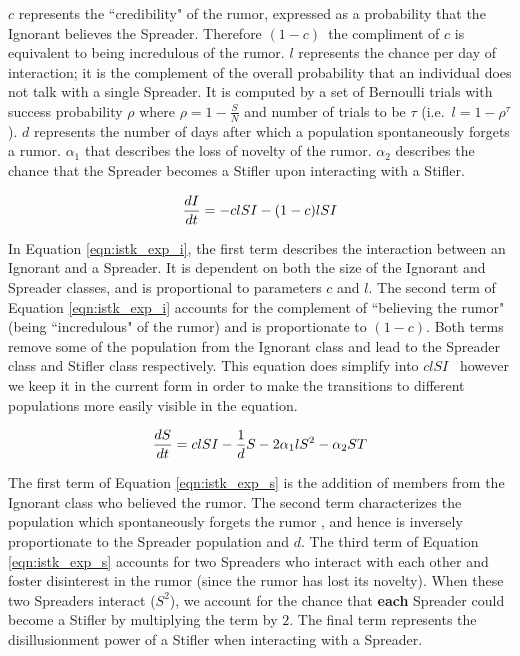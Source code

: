 $ c $ represents the ``credibility" of the rumor, expressed as a probability that the Ignorant believes the Spreader. Therefore $ (1 - c) $\, the compliment of $ c $ is equivalent to being incredulous of the rumor. $ l $ represents the chance per day of interaction; it is the complement of the overall probability that an individual does not talk with a single Spreader. It is computed by a set of Bernoulli trials with success probability $ \rho $ where $ \rho = 1 - \frac{S}{N} $ and number of trials to be $ \tau $ (i.e.~$ l = 1 - \rho^\tau $ ). $ d $ represents the number of days after which a population spontaneously forgets a rumor. $\alpha_1$ that describes the loss of novelty of the rumor. $ \alpha_2 $ describes the chance that the Spreader becomes a Stifler upon interacting with a Stifler.

\begin{equation} 
\label{eqn:istk_exp_i}
\frac{dI}{dt}  = - clSI - (1-c)lSI \\
\end{equation}
	
In Equation \ref{eqn:istk_exp_i}, the first term describes the interaction between an Ignorant and a Spreader. It is dependent on both the size of the Ignorant and Spreader classes, and is proportional to parameters $ c $ and $ l $.  The second term of Equation \ref{eqn:istk_exp_i} accounts for the complement of ``believing the rumor" (being ``incredulous" of the rumor) and is proportionate to $ (1 - c) $. Both terms remove some of the population from the Ignorant class and lead to the Spreader class and Stifler class respectively. This equation does simplify into $ clSI $ \, however we keep it in the current form in order to make the transitions to different populations more easily visible in the equation.

\begin{equation}
\label{eqn:istk_exp_s} \frac{dS}{dt} = clSI - \frac{1}{d} S - 2 \alpha_1l S^2 - \alpha_2 ST \\
\end{equation}

The first term of Equation \ref{eqn:istk_exp_s} is the addition of members from the Ignorant class who believed the rumor. The second term characterizes the population which spontaneously forgets the rumor , and hence is inversely proportionate to the Spreader population and $ d $. The third term of Equation \ref{eqn:istk_exp_s} accounts for two Spreaders who interact with each other and foster disinterest in the rumor (since the rumor has lost its novelty). When these two Spreaders interact ($S^2$), we account for the chance that \textbf{each} Spreader could become a Stifler by multiplying the term by $ 2 $. The final term represents the disillusionment power of a Stifler when interacting with a Spreader.

